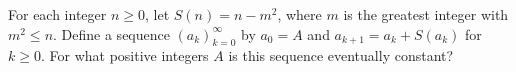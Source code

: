 For each integer $n \geq 0$, let $S(n) = n - m^2$, where $m$ is the
greatest integer with $m^2 \leq n$. Define a sequence
$(a_k)_{k=0}^\infty$ by $a_0 = A$ and $a_{k+1} = a_k + S(a_k)$ for $k
\geq 0$. For what positive integers $A$ is this sequence eventually constant?
